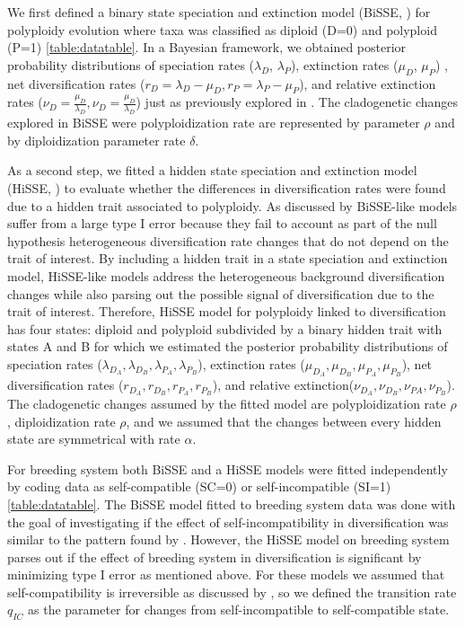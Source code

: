 We first defined a binary state speciation and extinction model (BiSSE, \citet{maddison_2007})  for polyploidy evolution where taxa was classified as diploid (D=0) and polyploid (P=1) \cref{table:datatable}.
In a Bayesian framework, we obtained posterior probability distributions of speciation rates ($\lambda_D$, $\lambda_P$), extinction rates ($\mu_D$, $\mu_P$) , net diversification rates ($r_D=\lambda_D-\mu_D, r_P=\lambda_P-\mu_P$), and  relative extinction rates ($\nu_D=\frac{\mu_D}{\lambda_D}, \nu_D=\frac{\mu_D}{\lambda_D}$) just as previously explored in \citet{mayrose_2011}.
The cladogenetic changes explored in BiSSE were polyploidization rate are represented by parameter $\rho$ and by diploidization parameter rate $\delta$.


As a second step, we fitted a hidden state speciation and extinction model (HiSSE, \citet{beaulieu_2016}) to evaluate whether the differences in diversification rates were found due to a hidden trait associated to polyploidy.
As discussed by \citet{beaulieu_2016} BiSSE-like models suffer from a large type I error because they fail to account as part of the null hypothesis heterogeneous diversification rate changes  that do not depend on the trait of interest.
By including a hidden trait in a state speciation and extinction  model,  HiSSE-like models address the heterogeneous background diversification changes while also parsing out the possible signal of diversification due to the trait of interest. 
Therefore, HiSSE model for polyploidy linked to diversification has four states: diploid and polyploid subdivided by a binary hidden trait with states A and B for which we estimated the posterior probability distributions of speciation rates ($\lambda_{D_A},\lambda_{D_B}, \lambda_{P_A},\lambda_{P_B}$), extinction rates ($\mu_{D_A},\mu_{D_B}, \mu_{P_A},\mu_{P_B}$),  net diversification rates ($r_{D_A},r_{D_B},r_{P_A},r_{P_B}$), and relative extinction($\nu_{D_A},\nu_{D_B}, \nu_{PA},\nu_{P_B}$).
The cladogenetic changes assumed by the fitted model are polyploidization rate $\rho$, diploidization rate $\rho$, and we assumed that the changes between every hidden state are symmetrical with rate $\alpha$.

For breeding system both BiSSE and a HiSSE models were fitted independently by coding data as self-compatible (SC=0) or self-incompatible (SI=1) \cref{table:datatable}.
The BiSSE model fitted to breeding system data was done with the goal of investigating if the effect of self-incompatibility in diversification was similar to the pattern found by \citet{goldberg_2012}.
However, the HiSSE model on breeding system parses out if the effect of breeding system in diversification is significant  by minimizing type I error as mentioned above.
For these models we assumed that self-compatibility is irreversible as discussed by \citet{igic_2013}, so we defined the transition rate $q_{IC}$ as the parameter for changes from self-incompatible to self-compatible state.

